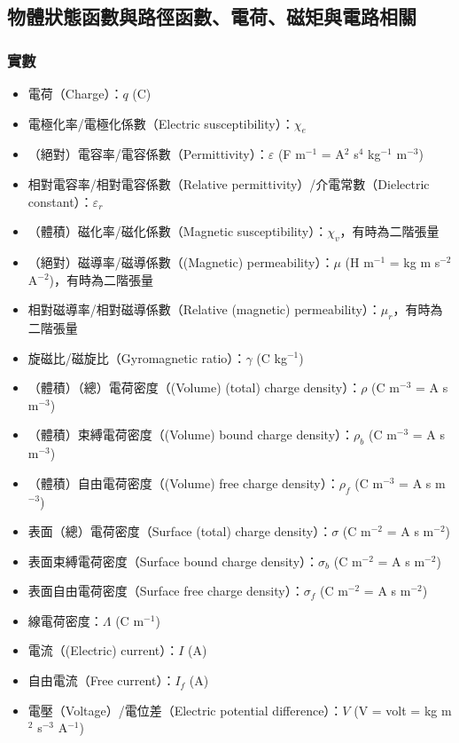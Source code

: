 \documentclass[a4paper,12pt]{report}
\begin{document}
\begin{itemize}
\subsection{物體狀態函數與路徑函數、電荷、磁矩與電路相關}
\subsubsection{實數}
\begin{itemize}
\item 電荷（Charge）：$q$ (C)
\item 電極化率/電極化係數（Electric susceptibility）：$\chi_e$
\item （絕對）電容率/電容係數（Permittivity）：$\varepsilon$ (F m$^{-1}$ = A$^2$ s$^4$ kg$^{-1}$ m$^{-3}$)
\item 相對電容率/相對電容係數（Relative permittivity）/介電常數（Dielectric constant）：$\varepsilon_r$
\item （體積）磁化率/磁化係數（Magnetic susceptibility）：$\chi_v$，有時為二階張量
\item （絕對）磁導率/磁導係數（(Magnetic) permeability）：$\mu$ (H m$^{-1}$ = kg m s$^{-2}$ A$^{-2}$)，有時為二階張量
\item 相對磁導率/相對磁導係數（Relative (magnetic) permeability）：$\mu_r$，有時為二階張量
\item 旋磁比/磁旋比（Gyromagnetic ratio）：$\gamma$ (C kg$^{-1}$)
\item （體積）（總）電荷密度（(Volume) (total) charge density）：$\rho$ (C m$^{-3}$ = A s m$^{-3}$)
\item （體積）束縛電荷密度（(Volume) bound charge density）：$\rho_b$ (C m$^{-3}$ = A s m$^{-3}$)
\item （體積）自由電荷密度（(Volume) free charge density）：$\rho_f$ (C m$^{-3}$ = A s m$^{-3}$)
\item 表面（總）電荷密度（Surface (total) charge density）：$\sigma$ (C m$^{-2}$ = A s m$^{-2}$)
\item 表面束縛電荷密度（Surface bound charge density）：$\sigma_b$ (C m$^{-2}$ = A s m$^{-2}$)
\item 表面自由電荷密度（Surface free charge density）：$\sigma_f$ (C m$^{-2}$ = A s m$^{-2}$)
\item 線電荷密度：$\Lambda$ (C m$^{-1}$)
\item 電流（(Electric) current）：$I$ (A)
\item 自由電流（Free current）：$I_f$ (A)
\item 電壓（Voltage）/電位差（Electric potential difference）：$V$ (V = volt = kg m$^2$ s$^{-3}$ A$^{-1}$)

\end{itemize}
\end{itemize}
\end{document}
